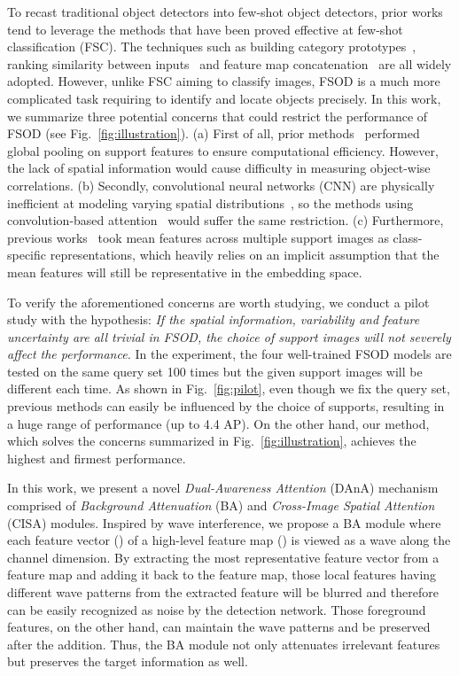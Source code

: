 \documentclass[journal]{IEEEtran}
\begin{document}
To recast traditional object detectors into few-shot object detectors, prior works tend to leverage the methods that have been proved effective at few-shot classification (FSC).
The techniques such as building category prototypes~\cite{snell2017prototypical, karlinsky2019repmet}, ranking similarity between inputs~\cite{koch2015siamese, fan2020few} and feature map concatenation~\cite{sung2018learning, fan2020fgn} are all widely adopted.
However, unlike FSC aiming to classify images, FSOD is a much more complicated task requiring to identify and locate objects precisely.
In this work, we summarize three potential concerns that could restrict the performance of FSOD (see Fig.~\ref{fig:illustration}).
(a) First of all, prior methods~\cite{karlinsky2019repmet, kang2019few, yan2019meta, fan2020fgn, perez2020incremental, liu2020crnet} performed global pooling on support features to ensure computational efficiency.
However, the lack of spatial information would cause difficulty in measuring object-wise correlations.
(b) Secondly, convolutional neural networks (CNN) are physically inefficient at modeling varying spatial distributions~\cite{hu2019local}, so the methods using convolution-based attention~\cite{bertinetto2016fully, fan2020fgn} would suffer the same restriction.
(c) Furthermore, previous works~\cite{karlinsky2019repmet, kang2019few, yan2019meta, fan2020fgn, fan2020few, perez2020incremental} took mean features across multiple support images as class-specific representations, which heavily relies on an implicit assumption that the mean features will still be representative in the embedding space.


To verify the aforementioned concerns are worth studying, we conduct a pilot study with the hypothesis: \textit{If the spatial information, variability and feature uncertainty are all trivial in FSOD, the choice of support images will not severely affect the performance.}
In the experiment, the four well-trained FSOD models are tested on the same query set 100 times but the given support images will be different each time.
As shown in Fig.~\ref{fig:pilot}, even though we fix the query set, previous methods can easily be influenced by the choice of supports, resulting in a huge range of performance (up to 4.4 AP).
On the other hand, our method, which solves the concerns summarized in Fig.~\ref{fig:illustration}, achieves the highest and firmest performance.


In this work, we present a novel \textit{Dual-Awareness Attention} (DAnA) mechanism comprised of \textit{Background Attenuation} (BA) and \textit{Cross-Image Spatial Attention} (CISA) modules.
Inspired by wave interference, we propose a BA module where each feature vector () of a high-level feature map () is viewed as a wave along the channel dimension.
By extracting the most representative feature vector from a feature map and adding it back to the feature map, those local features having different wave patterns from the extracted feature will be blurred and therefore can be easily recognized as noise by the detection network. 
Those foreground features, on the other hand, can maintain the wave patterns and be preserved after the addition.
Thus, the BA module not only attenuates irrelevant features but preserves the target information as well.
\end{document}
